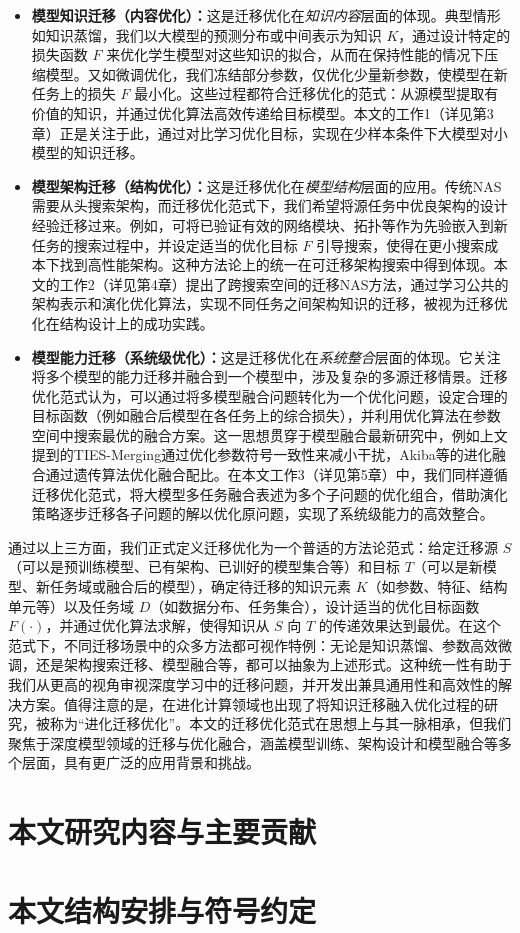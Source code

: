 \documentclass[../main.tex]{subfiles}
\begin{document}
\begin{itemize}
  \item \textbf{模型知识迁移（内容优化）：}这是迁移优化在\textit{知识内容}层面的体现。典型情形如知识蒸馏，我们以大模型的预测分布或中间表示为知识 $K$，通过设计特定的损失函数 $F$ 来优化学生模型对这些知识的拟合，从而在保持性能的情况下压缩模型。又如微调优化，我们冻结部分参数，仅优化少量新参数，使模型在新任务上的损失 $F$ 最小化。这些过程都符合迁移优化的范式：从源模型提取有价值的知识，并通过优化算法高效传递给目标模型。本文的工作1（详见第3章）正是关注于此，通过对比学习优化目标，实现在少样本条件下大模型对小模型的知识迁移。
  \item \textbf{模型架构迁移（结构优化）：}这是迁移优化在\textit{模型结构}层面的应用。传统NAS需要从头搜索架构，而迁移优化范式下，我们希望将源任务中优良架构的设计经验迁移过来。例如，可将已验证有效的网络模块、拓扑等作为先验嵌入到新任务的搜索过程中，并设定适当的优化目标 $F$ 引导搜索，使得在更小搜索成本下找到高性能架构。这种方法论上的统一在可迁移架构搜索中得到体现。本文的工作2（详见第4章）提出了跨搜索空间的迁移NAS方法，通过学习公共的架构表示和演化优化算法，实现不同任务之间架构知识的迁移，被视为迁移优化在结构设计上的成功实践。
  \item \textbf{模型能力迁移（系统级优化）：}这是迁移优化在\textit{系统整合}层面的体现。它关注将多个模型的能力迁移并融合到一个模型中，涉及复杂的多源迁移情景。迁移优化范式认为，可以通过将多模型融合问题转化为一个优化问题，设定合理的目标函数（例如融合后模型在各任务上的综合损失），并利用优化算法在参数空间中搜索最优的融合方案。这一思想贯穿于模型融合最新研究中，例如上文提到的TIES-Merging通过优化参数符号一致性来减小干扰，Akiba等的进化融合通过遗传算法优化融合配比。在本文工作3（详见第5章）中，我们同样遵循迁移优化范式，将大模型多任务融合表述为多个子问题的优化组合，借助演化策略逐步迁移各子问题的解以优化原问题，实现了系统级能力的高效整合。
\end{itemize}

通过以上三方面，我们正式定义迁移优化为一个普适的方法论范式：给定迁移源 $S$（可以是预训练模型、已有架构、已训好的模型集合等）和目标 $T$（可以是新模型、新任务域或融合后的模型），确定待迁移的知识元素 $K$（如参数、特征、结构单元等）以及任务域 $D$（如数据分布、任务集合），设计适当的优化目标函数 $F(\cdot)$，并通过优化算法求解，使得知识从 $S$ 向 $T$ 的传递效果达到最优。在这个范式下，不同迁移场景中的众多方法都可视作特例：无论是知识蒸馏、参数高效微调，还是架构搜索迁移、模型融合等，都可以抽象为上述形式。这种统一性有助于我们从更高的视角审视深度学习中的迁移问题，并开发出兼具通用性和高效性的解决方案。值得注意的是，在进化计算领域也出现了将知识迁移融入优化过程的研究，被称为“进化迁移优化”。本文的迁移优化范式在思想上与其一脉相承，但我们聚焦于深度模型领域的迁移与优化融合，涵盖模型训练、架构设计和模型融合等多个层面，具有更广泛的应用背景和挑战。

\section[\hspace{-2pt}本文研究内容与主要贡献]{{\heiti{} \hspace{-8pt}本文研究内容与主要贡献}}\label{sec:research-content-and-contribution}

\section[\hspace{-2pt}本文结构安排与符号约定]{{\heiti{} \hspace{-8pt}本文结构安排与符号约定}}\label{sec:structure-and-symbols}
\end{document}
